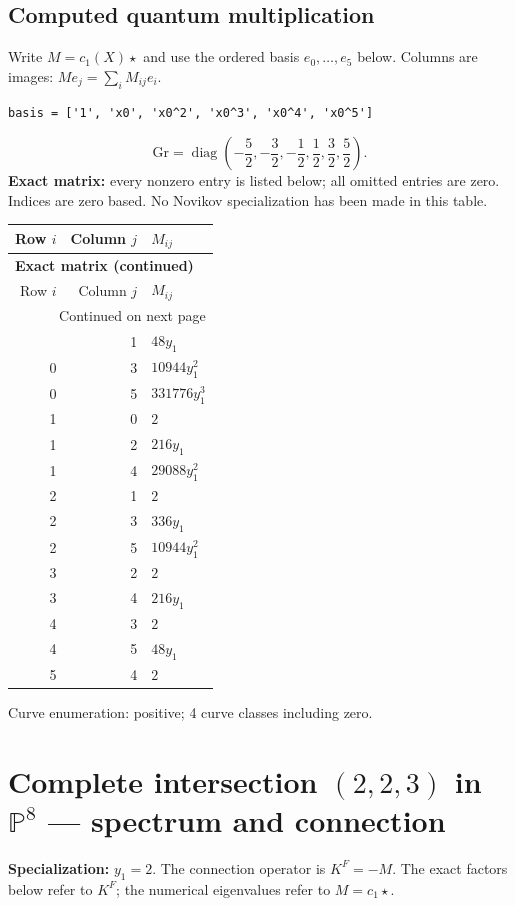 \documentclass[10pt,a4paper]{article}
\begin{document}
\subsection*{Computed quantum multiplication}
Write $M=c_1(X)\star$ and use the ordered basis $e_0,\ldots,e_{5}$ below. Columns are images: $M e_j=\sum_i M_{ij}e_i$.
\begin{lstlisting}
basis = ['1', 'x0', 'x0^2', 'x0^3', 'x0^4', 'x0^5']
\end{lstlisting}
\[\mathrm{Gr}=\operatorname{diag}\!\left(- \frac{5}{2},- \frac{3}{2},- \frac{1}{2},\frac{1}{2},\frac{3}{2},\frac{5}{2}\right).\]
\textbf{Exact matrix:} every nonzero entry is listed below; all omitted entries are zero. Indices are zero based. No Novikov specialization has been made in this table.
{\small\setlength{\tabcolsep}{7pt}\begin{longtable}{rrp{125mm}}
\toprule Row $i$ & Column $j$ & $M_{ij}$\\\midrule\endfirsthead
\multicolumn{3}{l}{\textbf{Exact matrix (continued)}}\\
\toprule Row $i$ & Column $j$ & $M_{ij}$\\\midrule\endhead
\midrule\multicolumn{3}{r}{Continued on next page}\\\endfoot\bottomrule\endlastfoot
0 & 1 & $48 y_{1}$\\
0 & 3 & $10944 y_{1}^{2}$\\
0 & 5 & $331776 y_{1}^{3}$\\
1 & 0 & $2$\\
1 & 2 & $216 y_{1}$\\
1 & 4 & $29088 y_{1}^{2}$\\
2 & 1 & $2$\\
2 & 3 & $336 y_{1}$\\
2 & 5 & $10944 y_{1}^{2}$\\
3 & 2 & $2$\\
3 & 4 & $216 y_{1}$\\
4 & 3 & $2$\\
4 & 5 & $48 y_{1}$\\
5 & 4 & $2$\\
\end{longtable}}
Curve enumeration: positive; 4 curve classes including zero.
\clearpage\section*{Complete intersection $(2,2,3)$ in $\mathbb P^{8}$ --- spectrum and connection}
\textbf{Specialization:} $y_1=2$. The connection operator is $K^F=-M$. The exact factors below refer to $K^F$; the numerical eigenvalues refer to $M=c_1\star$.
\end{document}
